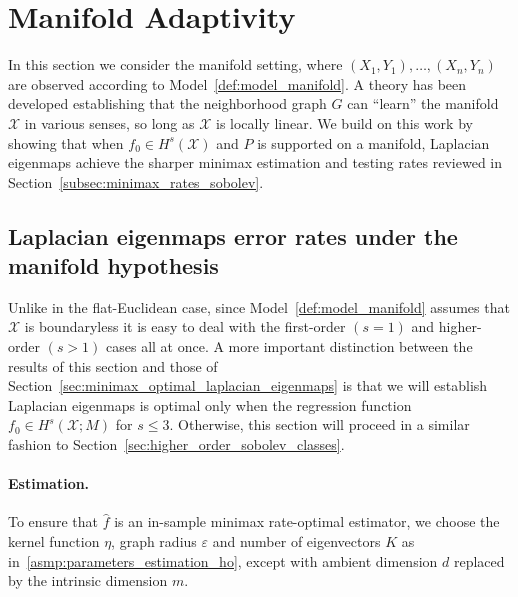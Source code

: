 \documentclass{article}
\newcommand{\1}{\mathbf{1}}
\newcommand{\Xset}{\mathcal{X}}
\newcommand{\mc}[1]{\mathcal{#1}}
\newcommand{\wh}[1]{\widehat{#1}}
\theoremstyle{alden}
\theoremstyle{aldenthm}
\theoremstyle{definition}
\theoremstyle{remark}
\begin{document}
\section{Manifold Adaptivity}
\label{sec:manifold_adaptivity}

In this section we consider the manifold setting, where $(X_1,Y_1),\ldots,(X_n,Y_n)$ are observed according to Model~\ref{def:model_manifold}. A theory has been developed \citep{niyogi2008finding,belkin03,belkin05,niyogi2013,balakrishnan2012minimax,balakrishnan2013cluster} establishing that the neighborhood graph $G$ can ``learn'' the manifold $\Xset$ in various senses, so long as $\Xset$ is locally linear. We build on this work by showing that when $f_0 \in H^s(\mc{X})$ and $P$ is supported on a manifold, Laplacian eigenmaps achieve the sharper minimax estimation and testing rates reviewed in Section~\ref{subsec:minimax_rates_sobolev}.

\subsection{Laplacian eigenmaps error rates under the manifold hypothesis}
Unlike in the flat-Euclidean case, since Model~\ref{def:model_manifold} assumes that $\mc{X}$ is boundaryless it is easy to deal with the first-order $(s = 1)$ and higher-order $(s > 1)$ cases all at once. A more important distinction between the results of this section and those of Section~\ref{sec:minimax_optimal_laplacian_eigenmaps} is that we will establish Laplacian eigenmaps is optimal only when the regression function $f_0 \in H^s(\mc{X};M)$ for $s \leq 3$. Otherwise, this section will proceed in a similar fashion to Section~\ref{sec:higher_order_sobolev_classes}.

\paragraph{Estimation.}
To ensure that $\wh{f}$ is an in-sample minimax rate-optimal estimator, we choose the kernel function $\eta$, graph radius $\varepsilon$ and number of eigenvectors $K$ as in~\ref{asmp:parameters_estimation_ho}, except with ambient dimension $d$ replaced by the intrinsic dimension $m$.
\end{document}
